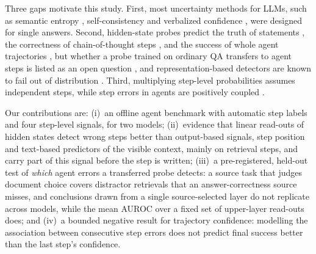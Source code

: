 \documentclass[11pt]{article}
\begin{document}
Three gaps motivate this study. First, most uncertainty methods for LLMs, such as semantic entropy
\citep{kuhn2023semantic,farquhar2024detecting}, self-consistency \citep{wang2023selfconsistency} and verbalized
confidence \citep{xiong2024can}, were designed for single answers. Second, hidden-state probes predict the truth of
statements \citep{azaria2023internal,marks2023geometry}, the correctness of chain-of-thought steps
\citep{ni2026reprobe}, and the success of whole agent trajectories \citep{mammen2026agents}, but whether a probe
trained on ordinary QA transfers to agent steps is listed as an open question \citep{lin2026uqagents}, and
representation-based detectors are known to fail out of distribution \citep{dubanowska2025representation}. Third,
multiplying step-level probabilities assumes independent steps, while step errors in agents are positively coupled
\citep{lin2026uqagents}.

Our contributions are:
(i)~an offline agent benchmark with automatic step labels and four step-level signals, for two models;
(ii)~evidence that linear read-outs of hidden states detect wrong steps better than output-based signals, step
position and text-based predictors of the visible context, mainly on retrieval steps, and carry part of this
signal before the step is written;
(iii)~a pre-registered, held-out test of \emph{which} agent errors a transferred probe detects: a source task that
judges document choice covers distractor retrievals that an answer-correctness source misses, and conclusions
drawn from a single source-selected layer do not replicate across models, while the mean AUROC over a fixed set of
upper-layer read-outs does; and
(iv)~a bounded negative result for trajectory confidence: modelling the association between consecutive step
errors does not predict final success better than the last step's confidence.
\end{document}
